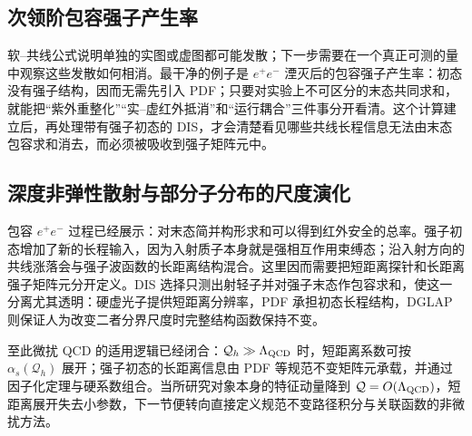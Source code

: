 

\subsection{次领阶包容强子产生率}\label{subsec:qcd-nlo-r-dp12}

软--共线公式说明单独的实图或虚图都可能发散；下一步需要在一个真正可测的量中观察这些发散如何相消。最干净的例子是 $e^+e^-$ 湮灭后的包容强子产生率：初态没有强子结构，因而无需先引入 PDF；只要对实验上不可区分的末态共同求和，就能把“紫外重整化”“实--虚红外抵消”和“运行耦合”三件事分开看清。这个计算建立后，再处理带有强子初态的 DIS，才会清楚看见哪些共线长程信息无法由末态包容求和消去，而必须被吸收到强子矩阵元中。



\subsection{深度非弹性散射与部分子分布的尺度演化}\label{subsec:qcd-dis-factorization-dp13}

包容 $e^+e^-$ 过程已经展示：对末态简并构形求和可以得到红外安全的总率。强子初态增加了新的长程输入，因为入射质子本身就是强相互作用束缚态；沿入射方向的共线涨落会与强子波函数的长距离结构混合。这里因而需要把短距离探针和长距离强子矩阵元分开定义。DIS 选择只测出射轻子并对强子末态作包容求和，使这一分离尤其透明：硬虚光子提供短距离分辨率，PDF 承担初态长程结构，DGLAP 则保证人为改变二者分界尺度时完整结构函数保持不变。





至此微扰 QCD 的适用逻辑已经闭合：$\mathcal Q_h\gg\Lambda_{\rm QCD}$ 时，短距离系数可按 $\alpha_s(\mathcal Q_h)$ 展开；强子初态的长距离信息由 PDF 等规范不变矩阵元承载，并通过因子化定理与硬系数组合。当所研究对象本身的特征动量降到 $\mathcal Q=O(\Lambda_{\rm QCD})$，短距离展开失去小参数，下一节便转向直接定义规范不变路径积分与关联函数的非微扰方法。
